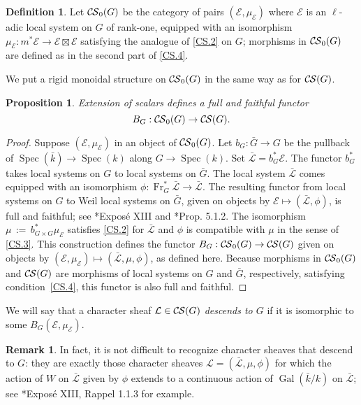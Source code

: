 \documentclass[10pt]{amsart}
\theoremstyle{plain}
\newtheorem{proposition}[theorem]{Proposition}
\theoremstyle{definition}
\newtheorem{definition}[theorem]{Definition}
\newtheorem{remark}[theorem]{Remark}
\newcommand{\bFq}{\bar{k}}
\newcommand{\Fq}{k}
\DeclareMathOperator{\Gal}{Gal}
\newcommand{\Frob}[1]{\operatorname{Fr}_{#1}}
\newcommand{\Spec}[1]{{\operatorname{Spec}(#1)}}
\newcommand{\ceq}{{\, :=\, }}
\newcommand{\cs}[1]{{\mathcal{#1}}}
\newcommand{\gcs}[1]{{\mathcal{\bar #1}}}
\newcommand{\CS}{{\mathcal{C\hskip-0.8pt S}}}
\newcommand{\bCS}{{\CS_0}}
\newcommand{\bG}{\bar{G}}
\begin{document}
\begin{definition}
Let $\bCS(G)$ be the category of pairs $(\cs{E},\mu_\cs{E})$
where $\cs{E}$ is an $\ell$-adic local system on $G$ of rank-one,
equipped with an isomorphism $\mu_\cs{E} : m^* \cs{E} \to \cs{E} \boxtimes \cs{E}$
satisfying the analogue of \ref{CS.2} on $G$;
morphisms in $\bCS(G)$ are defined as in the second part of
\ref{CS.4}. 
\end{definition}

We put a rigid monoidal structure on $\bCS(G)$ in the same way as for $\CS(G)$.

\begin{proposition}\label{prop:BG}
Extension of scalars defines a full and faithful functor
\[
B_G : \bCS(G) \to \CS(G).
\]
\end{proposition}

\begin{proof}
 Suppose $(\cs{E},\mu_\cs{E})$ in an object of $\bCS(G)$.
 Let $b_G : \bG \to G$ be the pullback of $\Spec{\bFq} \to \Spec{\Fq}$ along $G\to \Spec{\Fq}$.
 Set $\gcs{L} = b_G^* \cs{E}$. 
 The functor $b_G^*$ takes local systems on $G$ to local systems on $\bG$.
 The local system $\gcs{L}$ comes equipped with an isomorphism
 $\phi: \Frob{G}^* \gcs{L} \to \gcs{L}$.
 The resulting functor from local systems on $G$ to Weil local systems on $\bG$, given on objects by $\cs{E} \mapsto (\gcs{L},\phi)$, 
 is full and faithful; see \cite{deligne-katz:SGA7.2}*{Expos\'e XIII} and \cite{beilinson-bernstein-deligne:81a}*{Prop. 5.1.2}.
 The isomorphism $\mu \ceq b_{G\times G}^*\mu_\cs{E}$ satisfies \ref{CS.2}
 for $\gcs{L}$ and $\phi$ is compatible with $\mu$ in the sense of \ref{CS.3}.
 This construction defines the functor $B_G : \bCS(G) \to \CS(G)$ given on objects by $(\cs{E},\mu_\cs{E}) \mapsto (\gcs{L},\mu, \phi)$, as defined here. 
 Because morphisms in $\bCS(G)$ and $\CS(G)$ are morphisms of local systems on $G$ and $\bG$,
 respectively, satisfying condition~\ref{CS.4}, this functor is also full and faithful.
\end{proof}

We will say that a character sheaf $\cs{L} \in \CS(G)$ \emph{descends to $G$} if it is isomorphic to some $B_G(\cs{E}, \mu_\cs{E})$.

\begin{remark}\label{rem:descent}
In fact, it is not difficult to recognize character sheaves that descend to $G$: they are exactly those character sheaves
$\cs{L} = (\gcs{L},\mu,\phi)$ for which the action of $W$ on $\gcs{L}$ given by $\phi$ extends to a continuous action
of $\Gal(\bFq/\Fq)$ on $\gcs{L}$; see \cite{deligne-katz:SGA7.2}*{Expos\'e XIII, Rappel 1.1.3} for example. 
\end{remark}
\end{document}

